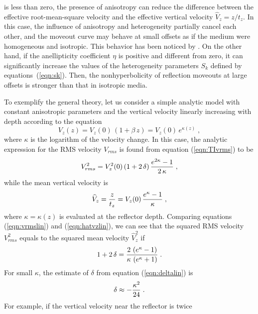 is less than zero, the presence of anisotropy can reduce the difference
between the effective root-mean-square velocity and the effective vertical 
velocity $\widehat{V}_z=z/t_z$. In this case, the influence of anisotropy
and heterogeneity partially cancel each other, and the moveout curve
may behave at small offsets as if the medium were homogeneous and
isotropic. This behavior has been noticed by
\cite{GEO58-10-14541467}. On the other hand, if the anellipticity
coefficient $\eta$ is positive and different from zero, it can
significantly increase the values of the heterogeneity parameters
$S_k$ defined by equations~(\ref{eqn:sk}). Then, the nonhyperbolicity 
of reflection moveouts at
large offsets is stronger than that in isotropic media.
\par
To exemplify the general theory, let us consider a simple analytic
model with constant anisotropic parameters and the vertical velocity
linearly increasing with depth according to the equation
\begin{equation}
V_z(z) = V_z(0)\,(1 + \beta \,z) = V_z(0)\,e^{\kappa(z)}\;,
\label{eqn:vzlin} 
\end{equation}
where $\kappa$ is the logarithm of the velocity change. In this case,
the analytic expression for the RMS velocity $V_{rms}$ is found
from equation (\ref{eqn:TIvrms}) to be
\begin{equation}
V_{rms}^2 = V_z^2(0)\,(1 + 2\,\delta)\,{{e^{2\kappa}-1}\over {2\,\kappa}}\;,
\label{eqn:vrmslin} 
\end{equation}
while the mean vertical velocity is
\begin{equation}
\widehat{V}_z = {z \over t_z} = 
V_z(0)\,{{e^{\kappa}-1}\over {\kappa}}\;,
\label{eqn:hatvzlin} 
\end{equation}
where $\kappa=\kappa(z)$ is evaluated at the reflector depth.
Comparing equations (\ref{eqn:vrmslin}) and (\ref{eqn:hatvzlin}), we can see 
that the squared RMS velocity $V_{rms}^2$ equals to the squared mean velocity
$\widehat{V}_z^2$ if
\begin{equation}
1 + 2\,\delta = {{2\,\left(e^\kappa - 1\right)} \over
{\kappa\,\left(e^\kappa + 1\right)}}\;.
\label{eqn:deltalin} 
\end{equation}
For small $\kappa$, the estimate of $\delta$ from equation
(\ref{eqn:deltalin}) is
\begin{equation}
\delta \approx - {\kappa^2 \over 24}\;.
\label{eqn:appdeltalin} 
\end{equation}
For example, if the vertical velocity near the reflector is twice
